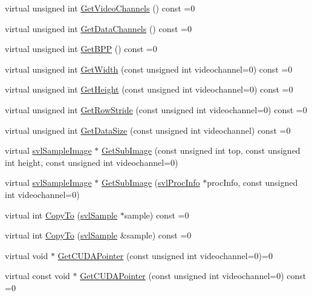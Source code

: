 \begin{DoxyCompactItemize}
\item 
virtual unsigned int \hyperlink{classsvl_sample_c_u_d_a_image_a37d6b27087d1c2f1c88c0a1f643f56e4}{Get\+Video\+Channels} () const =0
\item 
virtual unsigned int \hyperlink{classsvl_sample_c_u_d_a_image_a0c65f845f61252de75eb0ee7eec33c2a}{Get\+Data\+Channels} () const =0
\item 
virtual unsigned int \hyperlink{classsvl_sample_c_u_d_a_image_a70064e27b2da53aa23cc14a912df4947}{Get\+B\+P\+P} () const =0
\item 
virtual unsigned int \hyperlink{classsvl_sample_c_u_d_a_image_a3360fac3241f26806cc4bd792920338e}{Get\+Width} (const unsigned int videochannel=0) const =0
\item 
virtual unsigned int \hyperlink{classsvl_sample_c_u_d_a_image_ab6d91b6ab95b3a020018f2b619c68f15}{Get\+Height} (const unsigned int videochannel=0) const =0
\item 
virtual unsigned int \hyperlink{classsvl_sample_c_u_d_a_image_a86041b091b6227b6ed5ff7610b364733}{Get\+Row\+Stride} (const unsigned int videochannel=0) const =0
\item 
virtual unsigned int \hyperlink{classsvl_sample_c_u_d_a_image_a921357e8b357e1ce5b913c0d89150b5f}{Get\+Data\+Size} (const unsigned int videochannel) const =0
\item 
virtual \hyperlink{classsvl_sample_image}{svl\+Sample\+Image} $\ast$ \hyperlink{classsvl_sample_c_u_d_a_image_a0f07da2017998aef3bff17a0956dbc88}{Get\+Sub\+Image} (const unsigned int top, const unsigned int height, const unsigned int videochannel=0)
\item 
virtual \hyperlink{classsvl_sample_image}{svl\+Sample\+Image} $\ast$ \hyperlink{classsvl_sample_c_u_d_a_image_a45d29278924d1f0c66619d2b4ed4dc47}{Get\+Sub\+Image} (\hyperlink{structsvl_proc_info}{svl\+Proc\+Info} $\ast$proc\+Info, const unsigned int videochannel=0)
\item 
virtual int \hyperlink{classsvl_sample_c_u_d_a_image_a19dd2a29c0b61543699c2545d01adf89}{Copy\+To} (\hyperlink{classsvl_sample}{svl\+Sample} $\ast$sample) const =0
\item 
virtual int \hyperlink{classsvl_sample_c_u_d_a_image_ad2e4bb2a1d02a9c6c6ffab7c86dc881c}{Copy\+To} (\hyperlink{classsvl_sample}{svl\+Sample} \&sample) const =0
\item 
virtual void $\ast$ \hyperlink{classsvl_sample_c_u_d_a_image_a4a13798167e9c90354db8dcd9f2ee05a}{Get\+C\+U\+D\+A\+Pointer} (const unsigned int videochannel=0)=0
\item 
virtual const void $\ast$ \hyperlink{classsvl_sample_c_u_d_a_image_aacba1f3823ca1cfbfaf2210e786c6a0a}{Get\+C\+U\+D\+A\+Pointer} (const unsigned int videochannel=0) const =0
\end{DoxyCompactItemize}
